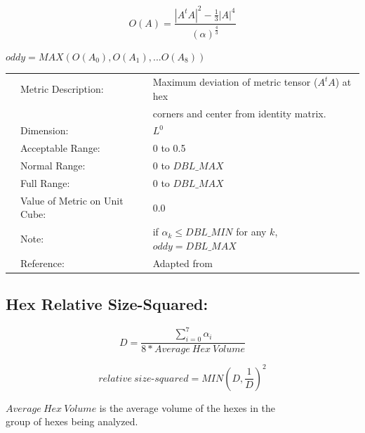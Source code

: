\documentclass[12pt]{article}
\begin{document}
\begin{displaymath}
O(A) = \frac {| A^t A |^2 - \frac {1}{3} | A |^4 } {(\alpha)^{ \frac {4}{3}}}
\end{displaymath}

\begin{center}
$oddy = MAX( O(A_0), O(A_1), ... O(A_8) )$
\end{center}

\begin{tabular}{lll}
& Metric Description:  & Maximum deviation of metric tensor ($A^t A$) at hex \\
&                      & corners and center from identity matrix.\\ 
& Dimension:           & $L^0$       \\ 
& Acceptable Range:    & 0 to 0.5 \\ 
& Normal Range:        & 0 to $DBL\_MAX$ \\ 
& Full Range:          & 0 to $DBL\_MAX$ \\
& Value of Metric on Unit Cube:    & 0.0 \\
& Note:                & if $\alpha_k \leq DBL\_MIN$ for any $k$, $oddy = DBL\_MAX$ \\ 
& Reference:           & Adapted from \cite{six} \\
\end{tabular} 


\subsection*{Hex Relative Size-Squared:}

\begin{displaymath}
D = {\frac {\sum_{i=0}^7 \alpha_i} {8*Average~Hex~Volume}} 
\end{displaymath}

\begin{displaymath}
relative~size \textrm{-}squared = {MIN( D, \frac {1}{D})}^2 
\end{displaymath}

\begin{flushleft}
$Average ~ Hex ~ Volume$ is the average volume of the hexes in the \\
group of hexes being analyzed. \\
\end{flushleft}
\end{document}
